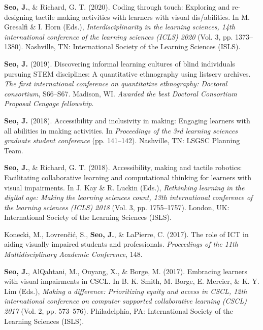 \documentclass[11pt,a4paper,]{awesome-cv}
\begin{document}
\leavevmode{}%
\textbf{Seo, J.}, \& Richard, G. T. (2020). Coding through touch:
Exploring and re-designing tactile making activities with learners with
visual dis/abilities. In M. Gresalfi \& I. Horn (Eds.),
\emph{Interdisciplinarity in the learning sciences, 14th international
  conference of the learning sciences (ICLS) 2020} (Vol. 3, pp.
1373--1380). Nashville, TN: International Society of the Learning
Sciences (ISLS).

\leavevmode{}%
\textbf{Seo, J.} (2019). Discovering informal learning cultures of blind
individuals pursuing STEM disciplines: A quantitative ethnography using
listserv archives. \emph{The first international conference on
  quantitative ethnography: Doctoral consortium}, S66--S67. Madison, WI.
\emph{Awarded the best Doctoral Consortium Proposal Cengage fellowship}.

\leavevmode{}%
\textbf{Seo, J.} (2018). Accessibility and inclusivity in making:
Engaging learners with all abilities in making activities. In
\emph{Proceedings of the 3rd learning sciences graduate student
  conference} (pp. 141--142). Nashville, TN: LSGSC Planning Team.

\leavevmode{}%
\textbf{Seo, J.}, \& Richard, G. T. (2018). Accessibility, making and
tactile robotics: Facilitating collaborative learning and computational
thinking for learners with visual impairments. In J. Kay \& R. Luckin
(Eds.), \emph{Rethinking learning in the digital age: Making the
  learning sciences count, 13th international conference of the learning
  sciences (ICLS) 2018} (Vol. 3, pp. 1755--1757). London, UK:
International Society of the Learning Sciences (ISLS).

\leavevmode{}%
Konecki, M., Lovrenčić, S., \textbf{Seo, J.}, \& LaPierre, C. (2017).
The role of ICT in aiding visually impaired students and professionals.
\emph{Proceedings of the 11th Multidisciplinary Academic Conference},
148.

\leavevmode{}%
\textbf{Seo, J.}, AlQahtani, M., Ouyang, X., \& Borge, M. (2017).
Embracing learners with visual impairments in CSCL. In B. K. Smith, M.
Borge, E. Mercier, \& K. Y. Lim (Eds.), \emph{Making a difference:
  Prioritizing equity and access in CSCL, 12th international conference on
  computer supported collaborative learning (CSCL) 2017} (Vol. 2, pp.
573--576). Philadelphia, PA: International Society of the Learning
Sciences (ISLS).
\end{document}

